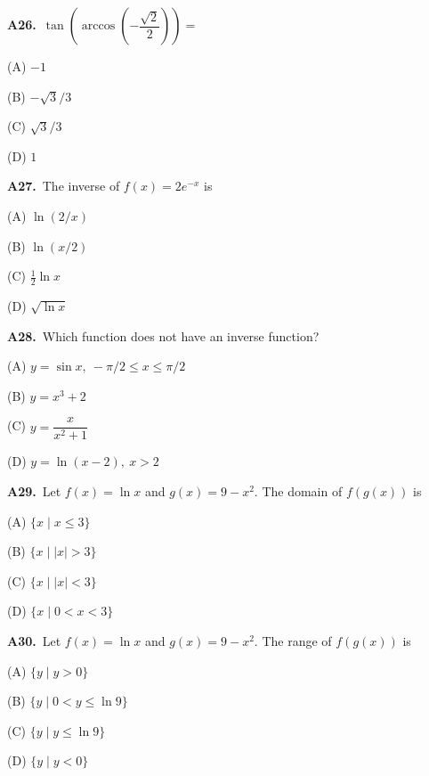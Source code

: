 \documentclass[11pt]{article}
\begin{document}
\bigskip\noindent\textbf{A26.}\ $\tan\left(\arccos\left(-\dfrac{\sqrt2}{2}\right)\right)=$
\begin{list}{}{\setlength{\leftmargin}{3em}\setlength{\labelwidth}{2.5em}\setlength{\itemsep}{0pt}\setlength{\topsep}{2pt}}
\item[(A)] $-1$
\item[(B)] $-\sqrt3/3$
\item[(C)] $\sqrt3/3$
\item[(D)] $1$
\end{list}

\bigskip\noindent\textbf{A27.}\ The inverse of $f(x)=2e^{-x}$ is
\begin{list}{}{\setlength{\leftmargin}{3em}\setlength{\labelwidth}{2.5em}\setlength{\itemsep}{0pt}\setlength{\topsep}{2pt}}
\item[(A)] $\ln(2/x)$
\item[(B)] $\ln(x/2)$
\item[(C)] $\frac12\ln x$
\item[(D)] $\sqrt{\ln x}$
\end{list}

\bigskip\noindent\textbf{A28.}\ Which function does not have an inverse function?
\begin{list}{}{\setlength{\leftmargin}{3em}\setlength{\labelwidth}{2.5em}\setlength{\itemsep}{0pt}\setlength{\topsep}{2pt}}
\item[(A)] $y=\sin x,\ -\pi/2\le x\le\pi/2$
\item[(B)] $y=x^3+2$
\item[(C)] $y=\dfrac{x}{x^2+1}$
\item[(D)] $y=\ln(x-2),\ x>2$
\end{list}

\bigskip\noindent\textbf{A29.}\ Let $f(x)=\ln x$ and $g(x)=9-x^2$. The domain of $f(g(x))$ is
\begin{list}{}{\setlength{\leftmargin}{3em}\setlength{\labelwidth}{2.5em}\setlength{\itemsep}{0pt}\setlength{\topsep}{2pt}}
\item[(A)] $\{x\mid x\le3\}$
\item[(B)] $\{x\mid |x|>3\}$
\item[(C)] $\{x\mid |x|<3\}$
\item[(D)] $\{x\mid0<x<3\}$
\end{list}

\bigskip\noindent\textbf{A30.}\ Let $f(x)=\ln x$ and $g(x)=9-x^2$. The range of $f(g(x))$ is
\begin{list}{}{\setlength{\leftmargin}{3em}\setlength{\labelwidth}{2.5em}\setlength{\itemsep}{0pt}\setlength{\topsep}{2pt}}
\item[(A)] $\{y\mid y>0\}$
\item[(B)] $\{y\mid0<y\le\ln9\}$
\item[(C)] $\{y\mid y\le\ln9\}$
\item[(D)] $\{y\mid y<0\}$
\end{list}
\end{document}
